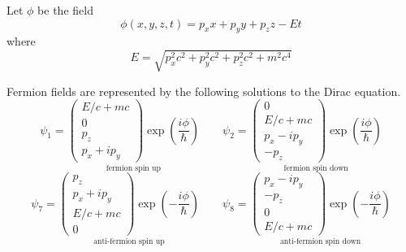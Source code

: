 \documentclass[12pt]{article}
\begin{document}
\noindent
Let $\phi$ be the field
\begin{equation*}
\phi(x,y,z,t)=p_xx+p_yy+p_zz-Et
\end{equation*}
where
\begin{equation*}
E=\sqrt{p_x^2c^2+p_y^2c^2+p_z^2c^2+m^2c^4}
\end{equation*}

\noindent
Fermion fields are represented by
the following solutions to the Dirac equation.
\begin{equation*}
\psi_1=\underset{\text{fermion spin up}}
{
\begin{pmatrix}E/c+mc\\0\\p_z\\p_x+ip_y\end{pmatrix}
\exp\left(\frac{i\phi}{\hbar}\right)
}
\qquad
\psi_2=\underset{\text{fermion spin down}}
{
\begin{pmatrix}0\\E/c+mc\\p_x-ip_y\\-p_z\end{pmatrix}
\exp\left(\frac{i\phi}{\hbar}\right)
}
\end{equation*}
\begin{equation*}
\psi_7=\underset{\text{anti-fermion spin up}}
{
\begin{pmatrix}p_z\\p_x+ip_y\\E/c+mc\\0\end{pmatrix}
\exp\left(-\frac{i\phi}{\hbar}\right)
}
\qquad
\psi_8=\underset{\text{anti-fermion spin down}}
{
\begin{pmatrix}p_x-ip_y\\-p_z\\0\\E/c+mc\end{pmatrix}
\exp\left(-\frac{i\phi}{\hbar}\right)
}
\end{equation*}
\end{document}
